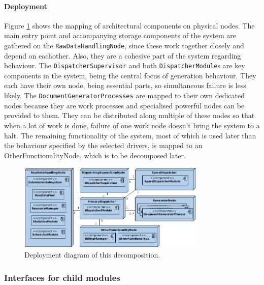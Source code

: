 \documentclass[a4paper,10pt]{article}
\begin{document}
\paragraph{Deployment}
Figure \ref{fig:it1-depl_main} shows the mapping of architectural components on physical nodes.
The main entry point and accompanying storage components of the system are gathered on the \texttt{RawDataHandlingNode}, since these work together closely and depend on eachother. Also, they are a cohesive part of the system regarding behaviour. The \texttt{DispatcherSupervisor} and both \texttt{DispatcherModule}s are key components in the system, being the central focus of generation behaviour. They each have their own node, being essential parts, so simultaneous failure is less likely. The \texttt{DocumentGeneratorProcesses} are mapped to their own dedicated nodes because they are work processes and specialised powerful nodes can be provided to them. They can be distributed along multiple of these nodes so that when a lot of work is done, failure of one work node doesn't bring the system to a halt. The remaining functionality of the system, most of which is used later than the behaviour specified by the selected drivers, is mapped to an OtherFunctionalityNode, which is to be decomposed later.

\begin{figure}[!htp]
    \centering
    \includegraphics[width=0.8\textwidth]{depl_diag_1.png}
    \caption{Deployment diagram of this decomposition.}\label{fig:it1-depl_main}
\end{figure}

\subsubsection{Interfaces for child modules}
\end{document}
